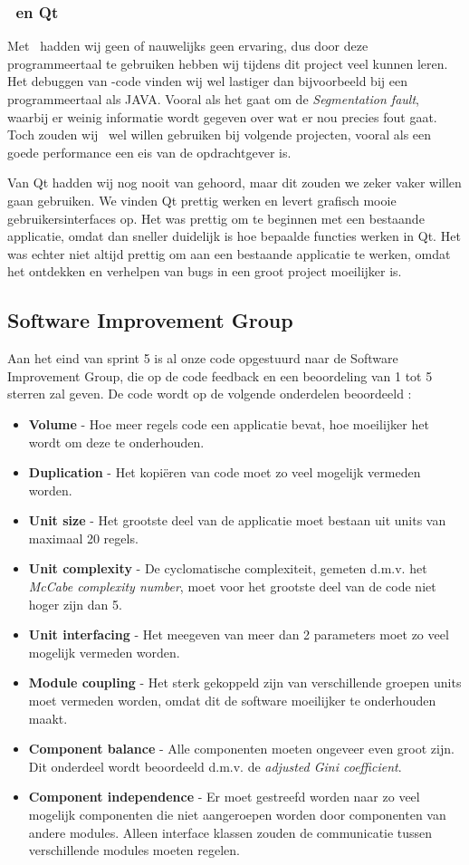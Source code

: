 \subsubsection{\cpp\ en Qt}
Met \cpp\ hadden wij geen of nauwelijks geen ervaring, dus door deze programmeertaal te gebruiken hebben wij tijdens dit project veel kunnen leren. Het debuggen van \cpp -code vinden wij wel lastiger dan bijvoorbeeld bij een programmeertaal als JAVA. Vooral als het gaat om de \emph{Segmentation fault}, waarbij er weinig informatie wordt gegeven over wat er nou precies fout gaat. Toch zouden wij \cpp\ wel willen gebruiken bij volgende projecten, vooral als een goede performance een eis van de opdrachtgever is. 

Van Qt hadden wij nog nooit van gehoord, maar dit zouden we zeker vaker willen gaan gebruiken. We vinden Qt prettig werken en levert grafisch mooie gebruikersinterfaces op. Het was prettig om te beginnen met een bestaande applicatie, omdat dan sneller duidelijk is hoe bepaalde functies werken in Qt. Het was echter niet altijd prettig om aan een bestaande applicatie te werken, omdat het ontdekken en verhelpen van bugs in een groot project moeilijker is. 

\subsection{Software Improvement Group}
Aan het eind van sprint 5 is al onze code opgestuurd naar de Software Improvement Group, die op de code feedback en een beoordeling van 1 tot 5 sterren zal geven. De code wordt op de volgende onderdelen beoordeeld \cite{sigmanual}:
\begin{itemize}
\item \textbf{Volume} - Hoe meer regels code een applicatie bevat, hoe moeilijker het wordt om deze te onderhouden.
\item \textbf{Duplication} - Het kopi\"eren van code moet zo veel mogelijk vermeden worden.
\item \textbf{Unit size} - Het grootste deel van de applicatie moet bestaan uit units van maximaal 20 regels.
\item \textbf{Unit complexity} - De cyclomatische complexiteit, gemeten d.m.v. het \emph{McCabe complexity number}, moet voor het grootste deel van de code niet hoger zijn dan 5.
\item \textbf{Unit interfacing} - Het meegeven van meer dan 2 parameters moet zo veel mogelijk vermeden worden.
\item \textbf{Module coupling} - Het sterk gekoppeld zijn van verschillende groepen units moet vermeden worden, omdat dit de software moeilijker te onderhouden maakt.
\item \textbf{Component balance} - Alle componenten moeten ongeveer even groot zijn. Dit onderdeel wordt beoordeeld d.m.v. de \emph{adjusted Gini coefficient}.
\item \textbf{Component independence} - Er moet gestreefd worden naar zo veel mogelijk componenten die niet aangeroepen worden door componenten van andere modules. Alleen interface klassen zouden de communicatie tussen verschillende modules moeten regelen.
\end{itemize}

